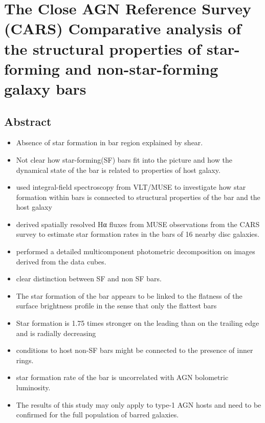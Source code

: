 \documentclass{article}
\begin{document}
\section{The Close AGN Reference Survey (CARS)
Comparative analysis of the structural properties of star-forming
and non-star-forming galaxy bars}

\subsection{Abstract}

\begin{itemize}
    \item Absence of star formation in bar region explained by shear.
    \item Not clear how star-forming(SF) bars fit into the picture and how the dynamical state of the bar is related to properties of host galaxy.
    \item used integral-field spectroscopy from VLT/MUSE to investigate how star formation within bars is connected to structural properties of the bar and the host galaxy
    \item derived spatially resolved Hα fluxes from MUSE observations from the CARS survey to estimate star formation rates in the bars of 16 nearby disc galaxies.
    \item performed a detailed multicomponent photometric decomposition on images derived from the data cubes.
    \item clear distinction between SF and non SF bars.
    \item The star formation of the bar appears to be linked to the flatness of the surface brightness profile in the sense that only the flattest bars
    \item Star formation is 1.75 times stronger on the leading than on the trailing edge and is radially decreasing
    \item conditions to host non-SF bars might be connected to the presence of inner rings.
    \item  star formation rate of the bar is uncorrelated with AGN bolometric luminosity.
    \item The results of this study may only apply to type-1 AGN hosts and need to be confirmed for the full population of barred galaxies.
\end{itemize}
\end{document}
